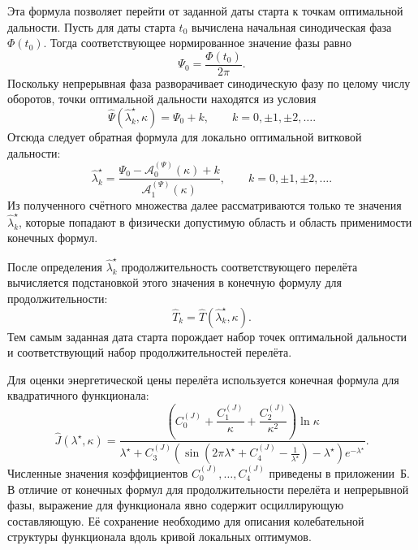 Эта формула позволяет перейти от заданной даты старта к точкам оптимальной дальности. Пусть для даты старта $t_0$ вычислена начальная синодическая фаза $\Phi(t_0)$. Тогда соответствующее нормированное значение фазы равно
\begin{equation}
	\Psi_0=\frac{\Phi(t_0)}{2\pi}.
\end{equation}
Поскольку непрерывная фаза разворачивает синодическую фазу по целому числу оборотов, точки оптимальной дальности находятся из условия
\begin{equation}
	\widehat{\Psi}\left(\widehat{\lambda}^{\star}_{k},\kappa\right)
	=
	\Psi_0+k,
	\qquad
	k=0,\pm1,\pm2,\ldots .
\end{equation}
Отсюда следует обратная формула для локально оптимальной витковой дальности:
\begin{equation}
	\widehat{\lambda}^{\star}_{k}
	=
	\frac{\Psi_0-\mathcal A_0^{(\Psi)}(\kappa)+k}{\mathcal A_1^{(\Psi)}(\kappa)},
	\qquad
	k=0,\pm1,\pm2,\ldots .
\end{equation}
Из полученного счётного множества далее рассматриваются только те значения $\widehat{\lambda}^{\star}_{k}$, которые попадают в физически допустимую область и область применимости конечных формул.

После определения $\widehat{\lambda}^{\star}_{k}$ продолжительность соответствующего перелёта вычисляется подстановкой этого значения в конечную формулу для продолжительности:
\begin{equation}
	\widehat{T}_k=
	\widehat{T}\left(\widehat{\lambda}^{\star}_{k},\kappa\right).
\end{equation}
Тем самым заданная дата старта порождает набор точек оптимальной дальности и соответствующий набор продолжительностей перелёта.

Для оценки энергетической цены перелёта используется конечная формула для квадратичного функционала:
\begin{equation}
	\widehat{J}\left(\lambda^\star,\kappa\right)=
	\frac{
		\left(
		C_0^{(J)}+\dfrac{C_1^{(J)}}{\kappa}+\dfrac{C_2^{(J)}}{\kappa^2}
		\right)\ln\kappa
	}{
		\lambda^\star
		+
		C_3^{(J)}
		\left(
		\sin\left(2\pi\lambda^\star+C_4^{(J)}-\frac{1}{\lambda^\star}\right)-\lambda^\star
		\right)e^{-\lambda^\star}
	}.
\end{equation}
Численные значения коэффициентов $C_0^{(J)},\ldots,C_4^{(J)}$ приведены в приложении~Б. В отличие от конечных формул для продолжительности перелёта и непрерывной фазы, выражение для функционала явно содержит осциллирующую составляющую. Её сохранение необходимо для описания колебательной структуры функционала вдоль кривой локальных оптимумов.

